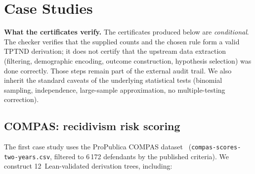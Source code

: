\documentclass{ceurart}
\begin{document}
\section{Case Studies}\label{sec:cases}

\smallskip\noindent
\textbf{What the certificates verify.}
The certificates produced below are \emph{conditional}.  The
checker verifies that the supplied counts and the chosen rule
form a valid TPTND derivation; it does not certify that the
upstream data extraction (filtering, demographic encoding,
outcome construction, hypothesis selection) was done correctly.
Those steps remain part of the external audit trail.  We also
inherit the standard caveats of the underlying statistical
tests (binomial sampling, independence, large-sample
approximation, no multiple-testing correction).

\subsection{COMPAS: recidivism risk scoring}\label{sec:compas}

The first case study uses the ProPublica COMPAS
dataset~\cite{angwin2016machine}
(\texttt{compas-scores-two-years.csv}, filtered to 6\,172
defendants by the published criteria).
We construct 12~Lean-validated derivation trees, including:
\end{document}

